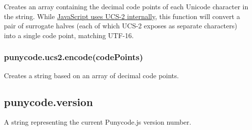 Creates an array containing the decimal code points of each Unicode
character in the string. While
\href{http://mathiasbynens.be/notes/javascript-encoding}{JavaScript uses
UCS-2 internally}, this function will convert a pair of surrogate halves
(each of which UCS-2 exposes as separate characters) into a single code
point, matching UTF-16.

\begin{Shaded}
\begin{Highlighting}[]
\NormalTok{(}\NormalTok{); }\CommentTok{// [97, 98, 99]}
\NormalTok{(}\NormalTok{); }\CommentTok{// [0x1D306]}
\end{Highlighting}
\end{Shaded}

\subsubsection{punycode.ucs2.encode(codePoints)}

Creates a string based on an array of decimal code points.

\begin{Shaded}
\begin{Highlighting}[]
\NormalTok{([}\NormalTok{, }\NormalTok{, }\NormalTok{]); }
\NormalTok{([}\NormalTok{]); }
\end{Highlighting}
\end{Shaded}

\subsection{punycode.version}

A string representing the current Punycode.js version number.
